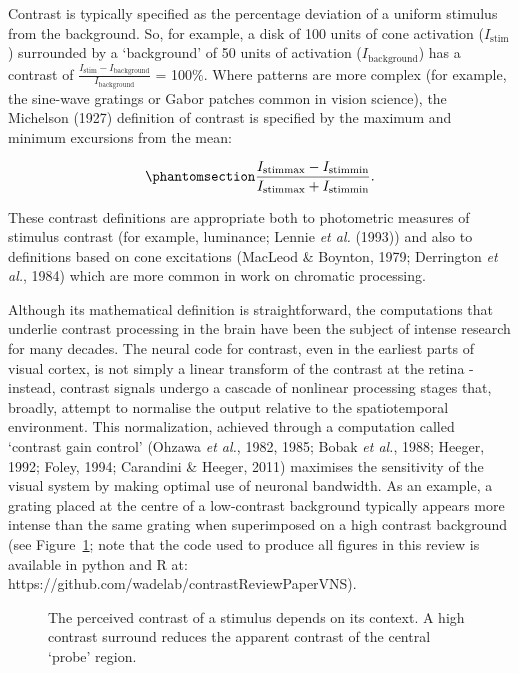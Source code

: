 \documentclass[
  letterpaper,
  DIV=11,
  numbers=noendperiod]{scrartcl}
\begin{document}
Contrast is typically specified as the percentage deviation of a uniform
stimulus from the background. So, for example, a disk of 100 units of
cone activation (\(I_{\mathrm{stim}}\)) surrounded by a `background' of
50 units of activation (\(I_{\mathrm{background}}\)) has a contrast of
\(\frac{I_{\mathrm{stim}} - I_{\mathrm{background}}}{I_{\mathrm{background}}}\)
= 100\%. Where patterns are more complex (for example, the sine-wave
gratings or Gabor patches common in vision science), the Michelson
(1927) definition of contrast is specified by the maximum and minimum
excursions from the mean:

\begin{equation}\phantomsection\label{eq-michelson}{\frac {I_{\mathrm{stimmax} }-I_{\mathrm{stimmin} }}{I_{\mathrm{stimmax} }+I_{\mathrm{stimmin} }}.}\end{equation}

These contrast definitions are appropriate both to photometric measures
of stimulus contrast (for example, luminance; Lennie \emph{et al.}
(1993)) and also to definitions based on cone excitations (MacLeod \&
Boynton, 1979; Derrington \emph{et al.}, 1984) which are more common in
work on chromatic processing.

Although its mathematical definition is straightforward, the
computations that underlie contrast processing in the brain have been
the subject of intense research for many decades. The neural code for
contrast, even in the earliest parts of visual cortex, is not simply a
linear transform of the contrast at the retina - instead, contrast
signals undergo a cascade of nonlinear processing stages that, broadly,
attempt to normalise the output relative to the spatiotemporal
environment. This normalization, achieved through a computation called
`contrast gain control' (Ohzawa \emph{et al.}, 1982, 1985; Bobak
\emph{et al.}, 1988; Heeger, 1992; Foley, 1994; Carandini \& Heeger,
2011) maximises the sensitivity of the visual system by making optimal
use of neuronal bandwidth. As an example, a grating placed at the centre
of a low-contrast background typically appears more intense than the
same grating when superimposed on a high contrast background (see
Figure~\ref{fig-centresurround}; note that the code used to produce all
figures in this review is available in python and R at:
https://github.com/wadelab/contrastReviewPaperVNS).

\begin{figure}


\caption{\label{fig-centresurround}The perceived contrast of a stimulus
depends on its context. A high contrast surround reduces the apparent
contrast of the central `probe' region.}

\end{figure}%
\end{document}
